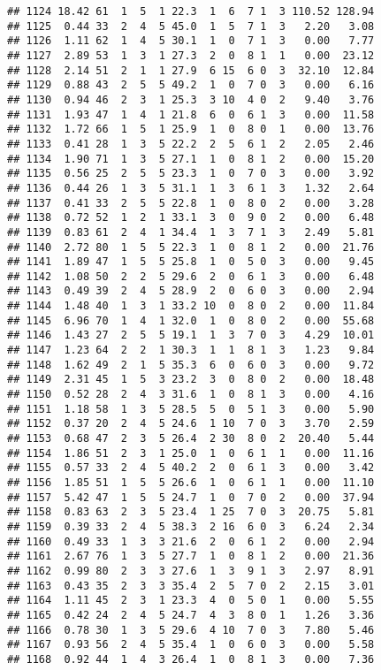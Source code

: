 \documentclass[
]{article}
\begin{document}
\begin{verbatim}
## 1124 18.42 61  1  5  1 22.3  1  6  7 1  3 110.52 128.94
## 1125  0.44 33  2  4  5 45.0  1  5  7 1  3   2.20   3.08
## 1126  1.11 62  1  4  5 30.1  1  0  7 1  3   0.00   7.77
## 1127  2.89 53  1  3  1 27.3  2  0  8 1  1   0.00  23.12
## 1128  2.14 51  2  1  1 27.9  6 15  6 0  3  32.10  12.84
## 1129  0.88 43  2  5  5 49.2  1  0  7 0  3   0.00   6.16
## 1130  0.94 46  2  3  1 25.3  3 10  4 0  2   9.40   3.76
## 1131  1.93 47  1  4  1 21.8  6  0  6 1  3   0.00  11.58
## 1132  1.72 66  1  5  1 25.9  1  0  8 0  1   0.00  13.76
## 1133  0.41 28  1  3  5 22.2  2  5  6 1  2   2.05   2.46
## 1134  1.90 71  1  3  5 27.1  1  0  8 1  2   0.00  15.20
## 1135  0.56 25  2  5  5 23.3  1  0  7 0  3   0.00   3.92
## 1136  0.44 26  1  3  5 31.1  1  3  6 1  3   1.32   2.64
## 1137  0.41 33  2  5  5 22.8  1  0  8 0  2   0.00   3.28
## 1138  0.72 52  1  2  1 33.1  3  0  9 0  2   0.00   6.48
## 1139  0.83 61  2  4  1 34.4  1  3  7 1  3   2.49   5.81
## 1140  2.72 80  1  5  5 22.3  1  0  8 1  2   0.00  21.76
## 1141  1.89 47  1  5  5 25.8  1  0  5 0  3   0.00   9.45
## 1142  1.08 50  2  2  5 29.6  2  0  6 1  3   0.00   6.48
## 1143  0.49 39  2  4  5 28.9  2  0  6 0  3   0.00   2.94
## 1144  1.48 40  1  3  1 33.2 10  0  8 0  2   0.00  11.84
## 1145  6.96 70  1  4  1 32.0  1  0  8 0  2   0.00  55.68
## 1146  1.43 27  2  5  5 19.1  1  3  7 0  3   4.29  10.01
## 1147  1.23 64  2  2  1 30.3  1  1  8 1  3   1.23   9.84
## 1148  1.62 49  2  1  5 35.3  6  0  6 0  3   0.00   9.72
## 1149  2.31 45  1  5  3 23.2  3  0  8 0  2   0.00  18.48
## 1150  0.52 28  2  4  3 31.6  1  0  8 1  3   0.00   4.16
## 1151  1.18 58  1  3  5 28.5  5  0  5 1  3   0.00   5.90
## 1152  0.37 20  2  4  5 24.6  1 10  7 0  3   3.70   2.59
## 1153  0.68 47  2  3  5 26.4  2 30  8 0  2  20.40   5.44
## 1154  1.86 51  2  3  1 25.0  1  0  6 1  1   0.00  11.16
## 1155  0.57 33  2  4  5 40.2  2  0  6 1  3   0.00   3.42
## 1156  1.85 51  1  5  5 26.6  1  0  6 1  1   0.00  11.10
## 1157  5.42 47  1  5  5 24.7  1  0  7 0  2   0.00  37.94
## 1158  0.83 63  2  3  5 23.4  1 25  7 0  3  20.75   5.81
## 1159  0.39 33  2  4  5 38.3  2 16  6 0  3   6.24   2.34
## 1160  0.49 33  1  3  3 21.6  2  0  6 1  2   0.00   2.94
## 1161  2.67 76  1  3  5 27.7  1  0  8 1  2   0.00  21.36
## 1162  0.99 80  2  3  3 27.6  1  3  9 1  3   2.97   8.91
## 1163  0.43 35  2  3  3 35.4  2  5  7 0  2   2.15   3.01
## 1164  1.11 45  2  3  1 23.3  4  0  5 0  1   0.00   5.55
## 1165  0.42 24  2  4  5 24.7  4  3  8 0  1   1.26   3.36
## 1166  0.78 30  1  3  5 29.6  4 10  7 0  3   7.80   5.46
## 1167  0.93 56  2  4  5 35.4  1  0  6 0  3   0.00   5.58
## 1168  0.92 44  1  4  3 26.4  1  0  8 1  3   0.00   7.36

\end{verbatim}
\end{document}
